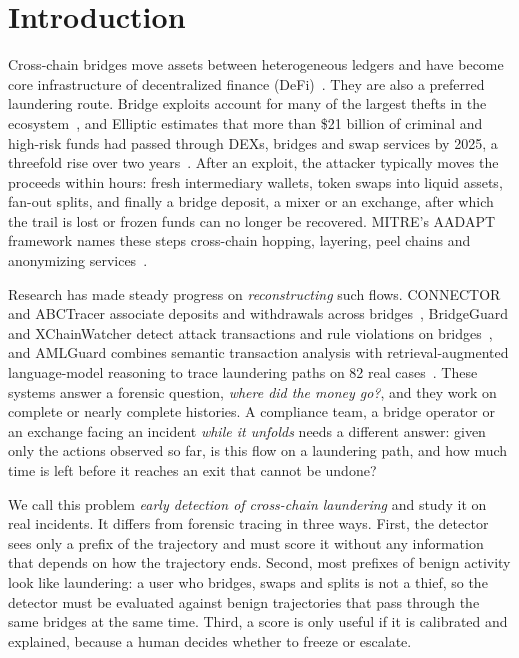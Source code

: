 \section{Introduction}
\label{sec:intro}

Cross-chain bridges move assets between heterogeneous ledgers and have become core infrastructure of decentralized finance (DeFi)~\cite{robinson2021survey,ou2022overview}.
They are also a preferred laundering route.
Bridge exploits account for many of the largest thefts in the ecosystem~\cite{lee2023sok}, and Elliptic estimates that more than \$21 billion of criminal and high-risk funds had passed through DEXs, bridges and swap services by 2025, a threefold rise over two years~\cite{elliptic2025crosschain}.
After an exploit, the attacker typically moves the proceeds within hours: fresh intermediary wallets, token swaps into liquid assets, fan-out splits, and finally a bridge deposit, a mixer or an exchange, after which the trail is lost or frozen funds can no longer be recovered.
MITRE's AADAPT framework names these steps cross-chain hopping, layering, peel chains and anonymizing services~\cite{mitre2025aadapt}.

Research has made steady progress on \emph{reconstructing} such flows.
CONNECTOR and ABCTracer associate deposits and withdrawals across bridges~\cite{lin2025connector,lin2025abctracer}, BridgeGuard and XChainWatcher detect attack transactions and rule violations on bridges~\cite{wu2025safeguarding,augusto2025xchainwatcher}, and AMLGuard combines semantic transaction analysis with retrieval-augmented language-model reasoning to trace laundering paths on 82 real cases~\cite{wu2026amlguard}.
These systems answer a forensic question, \emph{where did the money go?}, and they work on complete or nearly complete histories.
A compliance team, a bridge operator or an exchange facing an incident \emph{while it unfolds} needs a different answer: given only the actions observed so far, is this flow on a laundering path, and how much time is left before it reaches an exit that cannot be undone?

We call this problem \emph{early detection of cross-chain laundering} and study it on real incidents.
It differs from forensic tracing in three ways.
First, the detector sees only a prefix of the trajectory and must score it without any information that depends on how the trajectory ends.
Second, most prefixes of benign activity look like laundering: a user who bridges, swaps and splits is not a thief, so the detector must be evaluated against benign trajectories that pass through the same bridges at the same time.
Third, a score is only useful if it is calibrated and explained, because a human decides whether to freeze or escalate.


